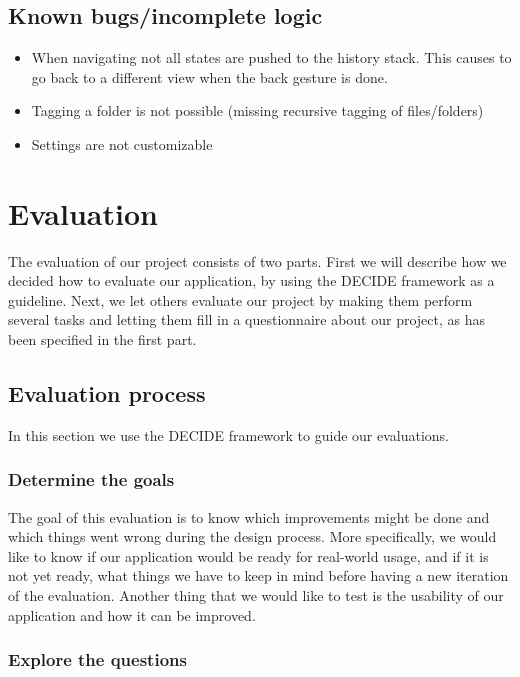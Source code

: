 \documentclass{article}
\begin{document}
\subsection{Known bugs/incomplete logic}
\begin{itemize}
\item When navigating not all states are pushed to the history stack. This causes to go back to a different view when the back gesture is done.
\item Tagging a folder is not possible (missing recursive tagging of files/folders)
\item Settings are not customizable
\end{itemize}

\newpage
\section{Evaluation}

The evaluation of our project consists of two parts. First we will describe how we decided how to evaluate our application, by using the DECIDE framework as a guideline. Next, we let others evaluate our project by making them perform several tasks and letting them fill in a questionnaire about our project, as has been specified in the first part.

\subsection{Evaluation process}
In this section we use the DECIDE framework to guide our evaluations.

\subsubsection{\textbf{D}etermine the goals}
The goal of this evaluation is to know which improvements might be done and which things went wrong during the design process. More specifically, we would like to know if our application would be ready for real-world usage, and if it is not yet ready, what things we have to keep in mind before having a new iteration of the evaluation. Another thing that we would like to test is the usability of our application and how it can be improved. 

\subsubsection{\textbf{E}xplore the questions}
\end{document}
